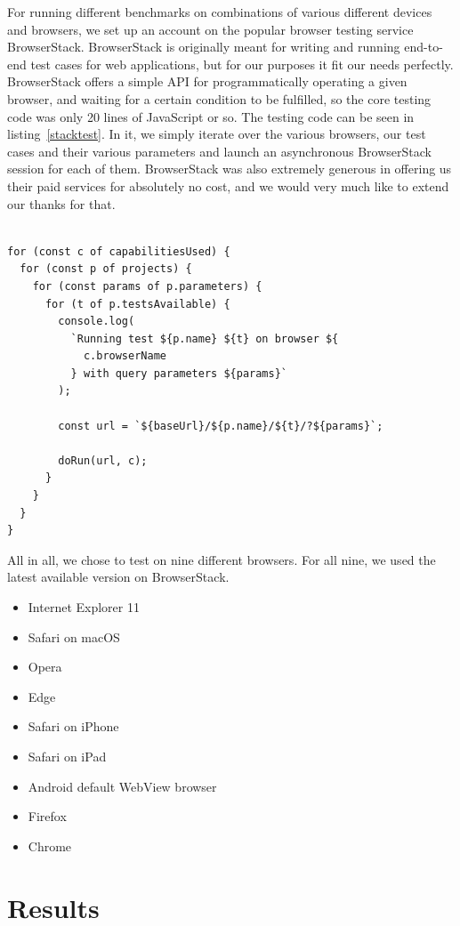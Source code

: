 \documentclass[conference]{IEEEtran}
\begin{document}
For running different benchmarks on combinations of various different
devices and browsers, we set up an account on the popular browser testing
service BrowserStack. BrowserStack is originally meant for writing and running
end-to-end test cases for web applications, but for our purposes it fit our
needs perfectly. BrowserStack offers a simple API for programmatically
operating a given browser, and waiting for a certain condition to be fulfilled,
so the core testing code was only 20 lines of JavaScript or so. The testing
code can be seen in listing~\ref{stacktest}. In it, we simply iterate over the
various browsers, our test cases and their various parameters and launch an
asynchronous BrowserStack session for each of them. BrowserStack was also
extremely generous in offering us their paid services for absolutely no cost,
and we would very much like to extend our thanks for that.

\begin{lstlisting}[caption={BrowserStack testing code},label=stacktest, basicstyle=\scriptsize]

for (const c of capabilitiesUsed) {
  for (const p of projects) {
    for (const params of p.parameters) {
      for (t of p.testsAvailable) {
        console.log(
          `Running test ${p.name} ${t} on browser ${
            c.browserName
          } with query parameters ${params}`
        );

        const url = `${baseUrl}/${p.name}/${t}/?${params}`;

        doRun(url, c);
      }
    }
  }
}
\end{lstlisting}

All in all, we chose to test on nine different browsers. For all nine, we used
the latest available version on BrowserStack.

\begin{itemize}
  \item Internet Explorer 11
  \item Safari on macOS
  \item Opera
  \item Edge
  \item Safari on iPhone
  \item Safari on iPad
  \item Android default WebView browser
  \item Firefox
  \item Chrome
\end{itemize}

\section{Results}
\end{document}

